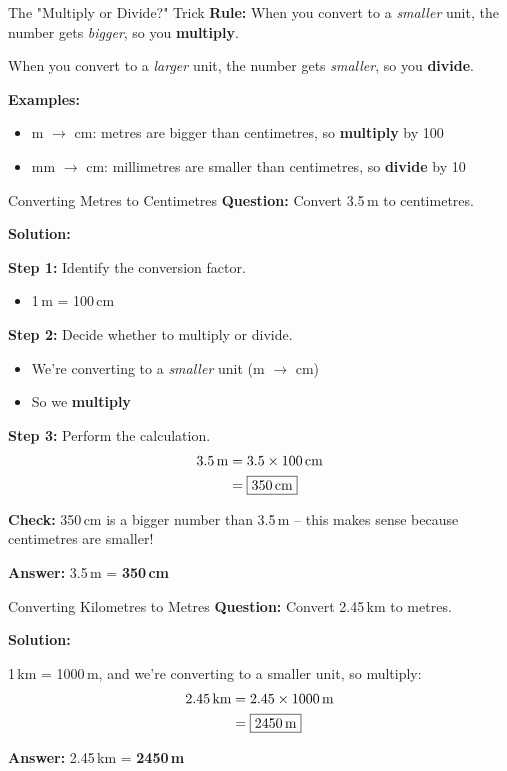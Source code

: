 \documentclass[12pt,a4paper]{article}
\begin{document}
\begin{tipbox}{The "Multiply or Divide?" Trick}
\textbf{Rule:} When you convert to a \textit{smaller} unit, the number gets \textit{bigger}, so you \textbf{multiply}.

When you convert to a \textit{larger} unit, the number gets \textit{smaller}, so you \textbf{divide}.

\textbf{Examples:}
\begin{itemize}[leftmargin=*]
\item m $\to$ cm: metres are bigger than centimetres, so \textbf{multiply} by 100
\item mm $\to$ cm: millimetres are smaller than centimetres, so \textbf{divide} by 10
\end{itemize}
\end{tipbox}


\begin{examplebox}{Converting Metres to Centimetres}
\textbf{Question:} Convert 3.5\,m to centimetres.

\textbf{Solution:}

\textbf{Step 1:} Identify the conversion factor.
\begin{itemize}
\item 1\,m = 100\,cm
\end{itemize}

\textbf{Step 2:} Decide whether to multiply or divide.
\begin{itemize}
\item We're converting to a \textit{smaller} unit (m $\to$ cm)
\item So we \textbf{multiply}
\end{itemize}

\textbf{Step 3:} Perform the calculation.
\begin{align*}
3.5\text{\,m} &= 3.5 \times 100\text{\,cm} \\
&= \boxed{350\text{\,cm}}
\end{align*}

\textbf{Check:} 350\,cm is a bigger number than 3.5\,m -- this makes sense because centimetres are smaller!

\textbf{Answer:} 3.5\,m = \textbf{350\,cm}
\end{examplebox}

\begin{examplebox}{Converting Kilometres to Metres}
\textbf{Question:} Convert 2.45\,km to metres.

\textbf{Solution:}

1\,km = 1000\,m, and we're converting to a smaller unit, so multiply:
\begin{align*}
2.45\text{\,km} &= 2.45 \times 1000\text{\,m} \\
&= \boxed{2450\text{\,m}}
\end{align*}

\textbf{Answer:} 2.45\,km = \textbf{2450\,m}
\end{examplebox}
\end{document}
